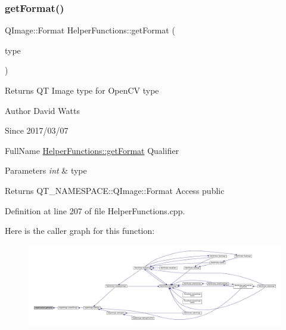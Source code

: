 \subsubsection{\texorpdfstring{get\+Format()}{getFormat()}}
{\footnotesize\ttfamily Q\+Image\+::\+Format Helper\+Functions\+::get\+Format (\begin{DoxyParamCaption}\item[{int}]{type }\end{DoxyParamCaption})\hspace{0.3cm}{\ttfamily [static]}}

Returns QT Image type for Open\+CV type

\begin{DoxyAuthor}{Author}
David Watts 
\end{DoxyAuthor}
\begin{DoxySince}{Since}
2017/03/07
\end{DoxySince}
Full\+Name \hyperlink{class_helper_functions_a64c4fa7fceb347bc87600d926ab9a6dc}{Helper\+Functions\+::get\+Format} Qualifier 
\begin{DoxyParams}{Parameters}
{\em int} & type \\
\hline
\end{DoxyParams}
\begin{DoxyReturn}{Returns}
Q\+T\+\_\+\+N\+A\+M\+E\+S\+P\+A\+C\+E\+::\+Q\+Image\+::\+Format Access public 
\end{DoxyReturn}


Definition at line 207 of file Helper\+Functions.\+cpp.

Here is the caller graph for this function\+:
\nopagebreak
\begin{figure}[H]
\begin{center}
\leavevmode
\includegraphics[width=350pt]{class_helper_functions_a64c4fa7fceb347bc87600d926ab9a6dc_icgraph}
\end{center}
\end{figure}
\mbox{\label{class_helper_functions_a1d33065de9de137025c132c3c9766130}} 
